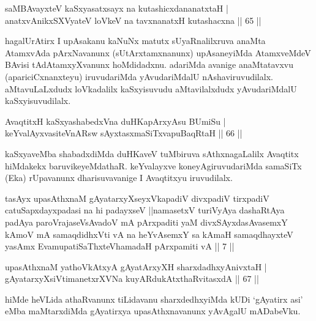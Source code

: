 \begin{shl}
saMBAvayxteV kaSxyasatxsayx na kutashicxdananatxtaH | \\
anatxvAnikxSXVyateV loVkeV na tavxnanatxH kutashacxna \hfill||  65 || 
\end{shl}

\begin{artha} 
hagalUrAtirx I upAsakanu kaNuNx matutx sUyaRnalilxruva anaMta 
AtamxvAda pArxNavanunx (sUtArxtamxnanunx) upAsaneyiMda AtamxveMdeV 
BAvisi tAdAtamxyXvanunx hoMdidadxnu. adariMda avanige anaMtatavxvu 
(apariciCxnanxteyu) iruvudariMda yAvudariMdalU nAshaviruvudilalx. 
aMtavuLaLxdudx loVkadalilx kaSxyisuvudu aMtavilalxdudx yAvudariMdalU 
kaSxyisuvudilalx.
\end{artha}

\begin{shl}
AvaqtitxH kaSxyashabedxVna duHKapArxyAsu BUmiSu | \\
keYvalAyxvasiteVnARsw sAyxtasxmaSiTxvapuBaqRtaH \hfill||  66 || 
\end{shl}

\begin{artha} 
kaSxyaveMba shabadxdiMda duHKaveV tuMbiruva sAthxnagaLalilx Avaqtitx 
hiMdakekx baruvikeyeMdathaR. keYvalayxve koneyAgiruvudariMda samaSiTx 
(Eka) rUpavanunx dharisuvavanige I Avaqtitxyu iruvudilalx.
\end{artha}

\begin{kandikeshl}
tasAyx upasAthxnaM gAyatarxyXseyxVkapadiV divxpadiV tirxpadiV catuSapxdayxpadasi na hi padayxseV ||namasetxV turiVyAya dashaRtAya padAya paroVrajaseV\s sAvadoV mA pArxpaditi yaM divxSAyxdasAvasemxY kAmoV mA samaqdidhxVti vA na heYvAsemxY sa kAmaH samaqdhayxteV yasAmx EvamupatiSaThxteV\s hamadaH pArxpamiti vA || 7 ||
\end{kandikeshl}

\begin{shl}
upasAthxnaM yathoVkAtxyA gAyatArxyXH sharxdadhxyA\s nivxtaH | \\
gAyatarxyXsiVtimanetxrXVNa kuyARdukAtxthaRvitasxdA \hfill||  67 || 
\end{shl}

\begin{artha} 
hiMde heVLida athaRvanunx tiLidavanu sharxdedhxyiMda kUDi `gAyatirx 
asi' eMba maMtarxdiMda gAyatirxya upasAthxnavanunx yAvAgalU mADabeVku.
\end{artha}

